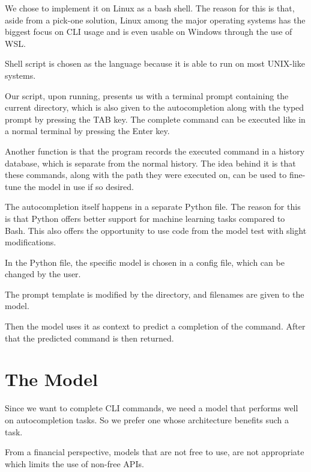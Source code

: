 We chose to implement it on Linux as a bash shell. The reason for this is that, aside from a pick-one solution, Linux among the major operating systems has the biggest focus on CLI usage and is even usable on Windows through the use of WSL.

 


Shell script is chosen as the language because it is able to run on most UNIX-like systems.



Our script, upon running, presents us with a terminal prompt containing the current directory, which is also given to the autocompletion along with the typed prompt by pressing the TAB key. The complete command can be executed like in a normal terminal by pressing the Enter key. 


Another function is that the program records the executed command in a history database, which is separate from the normal history. The idea behind it is that these commands, along with the path they were executed on, can be used to fine-tune the model in use if so desired.



The autocompletion itself happens in a separate Python file. The reason for this is that Python offers better support for machine learning tasks compared to Bash. This also offers the opportunity to use code from the model test with slight modifications.


In the Python file, the specific model is chosen in a config file, which can be changed by the user.

The prompt template is modified by the directory, and filenames are given to the model.

Then the model uses it as context to predict  a completion of the command.
After that the predicted command is then returned.





\section{The Model}\raggedbottom


Since we want to complete CLI commands, we need a model that performs well on autocompletion tasks. So we prefer one whose architecture benefits such a task. 

From a financial perspective, models that are not free to use, are not appropriate which limits the use of non-free APIs. 

